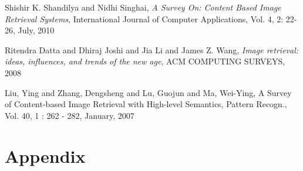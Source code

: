 \documentclass{report}
\begin{document}
\begin{thebibliography}{6}
	Shishir K. Shandilya and Nidhi Singhai,
	\emph{ A Survey On: Content Based Image Retrieval Systems},
	International Journal of Computer Applications,
	Vol. 4, 2: 22-26,
	July, 2010

    Ritendra Datta and Dhiraj Joshi and Jia Li and James Z. Wang,
    \emph{ Image retrieval: ideas, influences, and trends of the new age},
    ACM COMPUTING SURVEYS,
    2008

 Liu, Ying and Zhang, Dengsheng and Lu, Guojun and Ma, Wei-Ying,
 A Survey of Content-based Image Retrieval with High-level Semantics,
 Pattern Recogn.,
 Vol. 40, 1 : 262 - 282,
 January, 2007


\end{thebibliography}

\section{Appendix}


\end{document}
